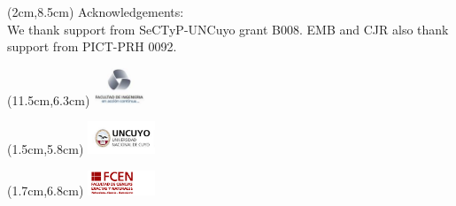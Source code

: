 \documentclass[12pt,t]{beamer}
\begin{document}
\begingroup
\makeatletter
\setlength{\hoffset}{-.5\beamer@sidebarwidth}
\makeatother
\begin{frame}[plain]
    \maketitle
    \begin{textblock*}{12cm}(2cm,8.5cm) %
    \tiny{Acknowledgements:\\ We thank support from SeCTyP-UNCuyo grant B008. EMB and CJR also thank support from PICT-PRH 0092.}
    \end{textblock*}
    \begin{textblock*}{1.5cm}(11.5cm,6.3cm) %
    \includegraphics[width=1.5cm]{fing.png}
    \end{textblock*}
    \begin{textblock*}{2cm}(1.5cm,5.8cm) %
    \includegraphics[width=2cm]{uncuyo.jpg}
    \end{textblock*}
    \begin{textblock*}{2cm}(1.7cm,6.8cm) %
    \includegraphics[width=2cm]{logofcen3.png}
    \end{textblock*}
\end{frame}
\endgroup
\end{document}
